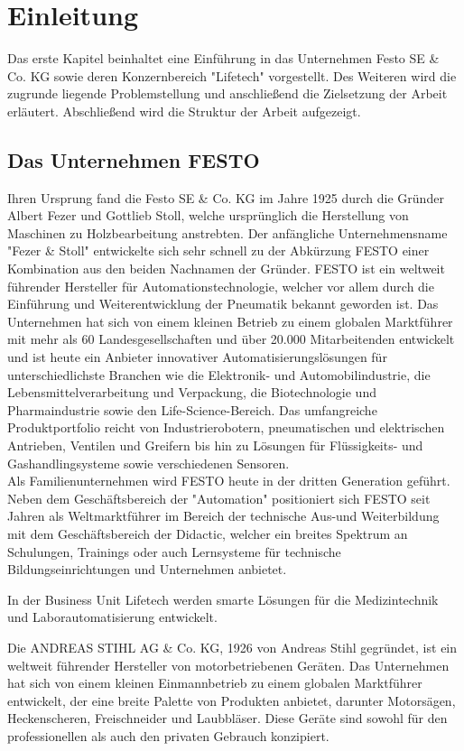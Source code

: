 \chapter{Einleitung}
Das erste Kapitel beinhaltet eine Einführung in das Unternehmen Festo SE \& Co. KG sowie deren Konzernbereich "Lifetech" vorgestellt. Des Weiteren wird die zugrunde liegende Problemstellung und anschließend die Zielsetzung der Arbeit erläutert. Abschließend wird die Struktur der Arbeit aufgezeigt.  


\section{Das Unternehmen FESTO}
Ihren Ursprung fand die Festo SE \& Co. KG im Jahre 1925 durch die Gründer Albert Fezer und Gottlieb Stoll, welche ursprünglich die Herstellung von Maschinen zu Holzbearbeitung anstrebten. Der anfängliche Unternehmensname "Fezer \& Stoll" entwickelte sich sehr schnell zu der Abkürzung \glqq FESTO\grqq{} einer Kombination aus den beiden Nachnamen der Gründer.  FESTO ist ein weltweit führender Hersteller für Automationstechnologie, welcher vor allem durch die Einführung und Weiterentwicklung der Pneumatik bekannt geworden ist. Das Unternehmen hat sich von einem kleinen Betrieb zu einem globalen Marktführer mit mehr als 60 Landesgesellschaften und über 20.000 Mitarbeitenden entwickelt und ist heute ein Anbieter innovativer Automatisierungslösungen für unterschiedlichste Branchen wie die Elektronik- und Automobilindustrie, die Lebensmittelverarbeitung und Verpackung, die Biotechnologie und Pharmaindustrie sowie den Life-Science-Bereich.
Das umfangreiche Produktportfolio reicht von Industrierobotern, pneumatischen und elektrischen Antrieben, Ventilen und Greifern bis hin zu Lösungen für Flüssigkeits- und Gashandlingsysteme sowie verschiedenen Sensoren.\\
Als Familienunternehmen wird FESTO heute in der dritten Generation geführt. Neben dem Geschäftsbereich der "Automation" positioniert sich FESTO seit Jahren als Weltmarktführer im Bereich der technische Aus-und Weiterbildung mit dem Geschäftsbereich der \glqq Didactic\grqq{}, welcher ein breites Spektrum an Schulungen, Trainings oder auch Lernsysteme für technische Bildungseinrichtungen und Unternehmen anbietet. \cite{FESTO2026}


In der Business Unit \glqq Lifetech\grqq{} werden smarte Lösungen für die Medizintechnik und Laborautomatisierung entwickelt. 

Die ANDREAS STIHL AG \& Co. KG, 1926 von Andreas Stihl gegründet, ist ein weltweit führender Hersteller von motorbetriebenen Geräten. Das Unternehmen hat sich von einem kleinen Einmannbetrieb zu einem globalen Marktführer entwickelt, der eine breite Palette von Produkten anbietet, darunter Motorsägen, Heckenscheren, Freischneider und Laubbläser. Diese Geräte sind sowohl für den professionellen als auch den privaten Gebrauch konzipiert.


